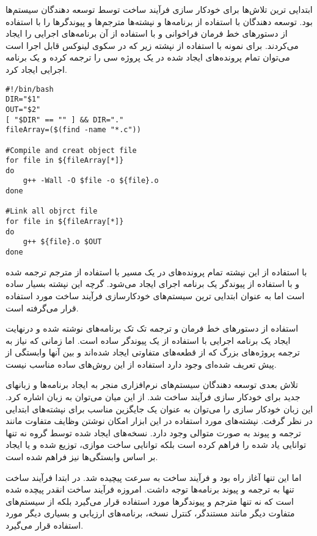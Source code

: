 
ابتدایی ترین تلاش‌ها برای خودکار سازی فرآیند ساخت توسط توسعه دهندگان سیستم‌ها
بود. توسعه دهندگان با استفاده از برنامه‌ها و نپشته‌ها مترجم‌ها و پیوندگرها را با
استفاده از دستورهای خط فرمان فراخوانی و با استفاده از آن برنامه‌های
اجرایی را ایجاد می‌کردند. برای نمونه با استفاده از نپشته زیر که در سکوی لینوکس
قابل اجرا است می‌توان تمام پرونده‌های ایجاد شده در یک پروژه سی را ترجمه کرده و
یک برنامه اجرایی ایجاد کرد.

\begin{latin}
\lstset{language=BASH}  
\begin{lstlisting}[frame=single] 
#!/bin/bash
DIR="$1"
OUT="$2"
[ "$DIR" == "" ] && DIR="."
fileArray=($(find -name "*.c"))

#Compile and creat object file
for file in ${fileArray[*]}
do
	g++ -Wall -O $file -o ${file}.o
done

#Link all objrct file
for file in ${fileArray[*]}
do
	g++ ${file}.o $OUT
done

\end{lstlisting}
\end{latin}

با استفاده از این نپشته تمام پرونده‌های  در یک مسیر با استفاده از مترجم
 ترجمه شده و با استفاده از پیوندگر یک برنامه اجرای
ایجاد می‌شود.
گرچه این نپشته بسیار ساده است اما به عنوان ابتدایی ترین سیستم‌های خودکارسازی
فرآیند ساخت مورد استفاده قرار می‌گرفته است.

استفاده از دستورهای خط فرمان و ترجمه تک تک برنامه‌های نوشته شده و درنهایت ایجاد
یک برنامه اجرایی با استفاده از یک پیوندگر ساده است. اما زمانی که نیاز به ترجمه
پروژه‌های بزرگ که از قطعه‌های متفاوتی ایجاد شده‌اند و بین آنها وابستگی از پیش
تعریف شده‌ای وجود دارد استفاده از این روش‌های ساده مناسب نیست.

تلاش بعدی توسعه دهندگان سیستم‌های نرم‌افزاری منجر به ایجاد برنامه‌ها و زبانهای
جدید برای خودکار سازی فرآیند ساخت شد. از این میان می‌توان به زبان 
اشاره کرد. این زبان خودکار سازی را می‌توان به عنوان یک جایگزین مناسب برای
نپشته‌های ابتدایی در نظر گرفت. نپشته‌های مورد استفاده در این ابزار امکان نوشتن
وظایف متفاوت مانند ترجمه و پیوند به صورت متوالی  وجود دارد. نسخه‌های ایجاد شده
توسط گروه  نه تنها توانایی یاد شده را فراهم کرده است بلکه توانایی ساخت
موازی، توزیع شده و یا ایجاد بر اساس وابستگی‌ها نیز فراهم شده است.

اما این تنها آغاز راه بود و فرآیند ساخت به سرعت پیچیده شد. در ابتدا فرآیند ساخت
تنها به ترجمه و پیوند برنامه‌ها توجه داشت. امروزه فرآیند ساخت انقدر پیچده شده
است که نه تنها مترجم‌ و پیوندگرها مورد استفاده قرار می‌گیرد بلکه از سیستم‌های
متفاوت دیگر مانند مستندگر، کنترل نسخه، برنامه‌های ارزیابی و بسیاری دیگر مورد
استفاده قرار می‌گیرد. 

